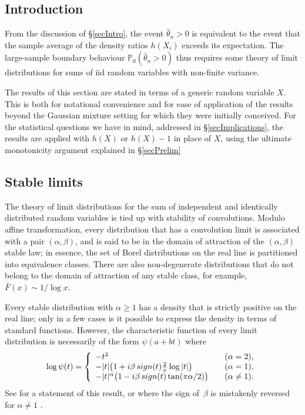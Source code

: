 \documentclass[11pt]{article}
\theoremstyle{definition}
\newcommand{\PP}{\mathbb{P}}
\def\sign{\mathop{\rm sign}\nolimits}
\begin{document}
\subsection{Introduction}

From the discussion of \S \ref{secIntro}, the event $\hat\theta_n >0$ is equivalent to the event that the sample average of the density ratios $h(X_i)$ exceeds its expectation. The large-sample boundary behaviour $\PP_0(\hat\theta_n >0)$ thus requires some theory of limit distributions for sums of iid random variables with non-finite variance.

The results of this section are stated in terms of a generic random variable $X$. This is both for notational convenience and for ease of application of the results beyond the Gaussian mixture setting for which they were initially conceived. For the statistical questions we have in mind, addressed in \S \ref{secImplications}, the results are applied with $h(X)$ or $h(X)-1$ in place of $X$, using the ultimate monotonicity argument explained in \S \ref{secPrelim}


\subsection{Stable limits}\label{secStable}
The theory of limit distributions for the sum of independent and identically distributed random variables is tied up with stability of convolutions.  Modulo affine transformation, every distribution that has a convolution limit is associated with a pair $(\alpha,\beta)$, and is said to be in the domain of attraction of the $(\alpha, \beta)$ stable law;  in essence, the set of Borel distributions on the real line is partitioned into equivalence classes. There are also non-degenerate distributions that do not belong to the domain of attraction of any stable class, for example, $\bar F(x) \sim 1/\log x$.

Every stable distribution with $\alpha \ge 1$ has a density that is strictly positive on the real line; only in a few cases is it possible to express the density in terms of standard functions. However, the characteristic function of every limit distribution is necessarily of the form $\psi(a + b t)$ where
\[
\log \psi(t) =  \left\{ \begin{array}{ll} 
- t^2 & \quad(\alpha = 2), \\
-|t|\bigl(1 +   i\beta \sign(t) \frac{2}{\pi}\log|t| \bigr)  & \quad (\alpha = 1),\\
-|t|^\alpha \bigl(1 - i \beta \sign(t) \tan(\pi\alpha/2) \bigr) & \quad (\alpha \neq 1).
\end{array} \right.
\]
See \citet[][Theorem~8.3.2]{Bingham} for a statement of this result, or
\citet[][chapter~34]{GK1954} where the sign of~$\beta$ is mistakenly reversed for $\alpha\neq 1$ \citep[see comment I.7 on page 253 of][]{Zolotarev}. 
\end{document}
